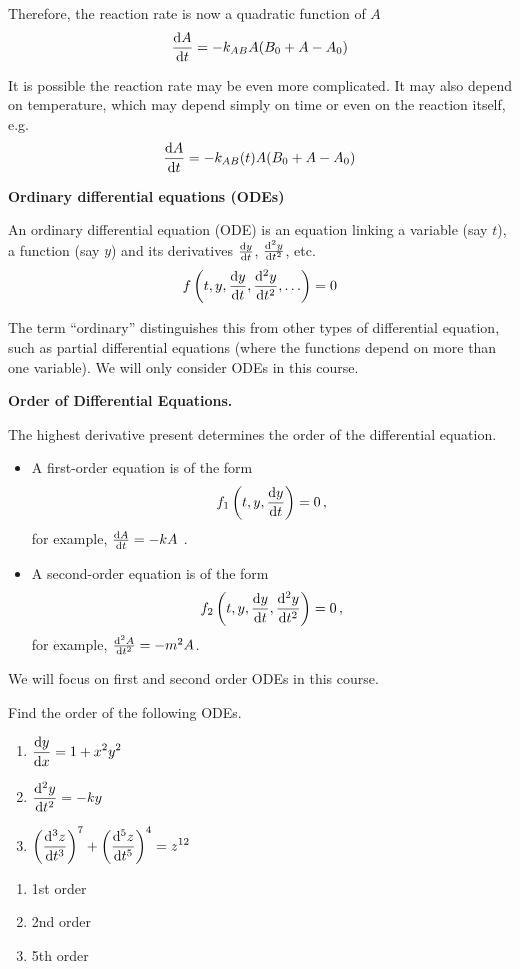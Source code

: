 Therefore, the reaction rate is now a quadratic function of $A$
\[
\frac{{\rm d} A}{{\rm d} t}=-{k}_{AB}A({B}_{0}+A-{A}_{0})
\]

It is possible the reaction rate may be even more complicated. It may also depend on temperature, which may depend simply on time or even on the reaction itself, e.g.
\[
\frac{{\rm d} A}{{\rm d} t}=-{k}_{AB}(t)A({B}_{0}+A-{A}_{0})
\]


\textbf{Ordinary differential equations (ODEs)}

An ordinary differential equation (ODE) is an equation linking a variable (say $t$), a function (say $y$) and its derivatives $\frac{{\rm d} y}{{\rm d} t}$, $\frac{{\rm d} ^2y}{{\rm d} t^2}$, etc.
\[
f\left(t,y,\frac{{\rm d} y}{{\rm d} t},\frac{{\rm d} ^2y}{{\rm d} t^2},\ldots \right)=0
\]

The term ``ordinary'' distinguishes this from other types of differential equation, such as partial differential equations (where the functions depend on more than one variable). We will only consider ODEs in this course.


\textbf{Order of Differential Equations.}

The highest derivative present determines the order of the differential equation.
\begin{itemize}
\item A first-order equation is of the form
\[
f_1\left(t,y,\frac{{\rm d} y}{{\rm d} t}\right)=0 \, ,
\]
for example, $\frac{{\rm d} A}{{\rm d} t}=-kA$ .
\item A second-order equation is of the form
\[
f_2\left(t,y,\frac{{\rm d} y}{{\rm d} t},\frac{{\rm d} ^2y}{{\rm d} t^2}\right)=0\, ,
\]
for example, $\frac{{\rm d} ^2A}{{\rm d} t^2}=-m^2A$.
\end{itemize}
We will focus on first and second order ODEs in this course.


\goodbreak
\begin{example}[Lecture]
\label{ex:611}
Find the order of the following ODEs.
\begin{enumerate}[label=(\alph*)]
\item $\displaystyle \frac{{\rm d} y}{{\rm d} x}=1+x^2y^2$\par
\item $\displaystyle \frac{{\rm d} ^2y}{{\rm d} t^2}=-ky$\par
\item $\displaystyle \left(\frac{{\rm d} ^3z}{{\rm d} t^3}\right)^7+\left(\frac{{\rm d} ^5z}{{\rm d} t^5}\right)^4=z^{12}$\par
\end{enumerate}
\end{example}
\begin{solution}
\begin{enumerate}[label=(\alph*)]
\item 1st order
\item 2nd order 
\item 5th order
\end{enumerate}
\end{solution}

